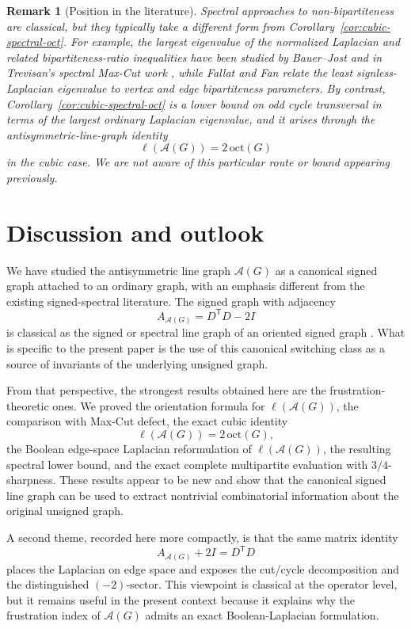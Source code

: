 \documentclass[11pt]{article}
\newtheorem{remark}{Remark}
\theoremstyle{plain}
\begin{document}
\begin{remark}[Position in the literature]
\label{rem:spectral-literature}
Spectral approaches to non-bipartiteness are classical, but they typically take a
different form from Corollary~\ref{cor:cubic-spectral-oct}.
For example, the largest eigenvalue of the normalized Laplacian and related
bipartiteness-ratio inequalities have been studied by Bauer--Jost
\cite{BauerJost2013} and in Trevisan's spectral Max-Cut work
\cite{Trevisan2012}, while Fallat and Fan \cite{FallatFan2012} relate the least
signless-Laplacian eigenvalue to vertex and edge bipartiteness parameters.
By contrast, Corollary~\ref{cor:cubic-spectral-oct} is a lower bound on odd
cycle transversal in terms of the largest \emph{ordinary} Laplacian eigenvalue,
and it arises through the antisymmetric-line-graph identity
\[
\ell(\mathcal A(G))=2\,\mathrm{oct}(G)
\]
in the cubic case.
We are not aware of this particular route or bound appearing previously.
\end{remark}

\section{Discussion and outlook}
\label{sec:outlook}

We have studied the antisymmetric line graph $\mathcal{A}(G)$ as a canonical
signed graph attached to an ordinary graph, with an emphasis different from the
existing signed-spectral literature. The signed graph with adjacency
\[
A_{\mathcal A(G)}=D^{\mathsf T}D-2I
\]
is classical as the signed or spectral line graph of an oriented signed graph
\cite{GerminaHameedZaslavsky2011,Zaslavsky2010Matrices,BelardoPisanskiStanicZaslavsky2023}.
What is specific to the present paper is the use of this canonical switching
class as a source of invariants of the underlying unsigned graph.

From that perspective, the strongest results obtained here are the
frustration-theoretic ones. We proved the orientation formula for
$\ell(\mathcal A(G))$, the comparison with Max-Cut defect, the exact cubic
identity
\[
\ell(\mathcal A(G))=2\,\mathrm{oct}(G),
\]
the Boolean edge-space Laplacian reformulation of $\ell(\mathcal A(G))$, the
resulting spectral lower bound, and the exact complete multipartite evaluation
with $3/4$-sharpness. These results appear to be new and show that the canonical
signed line graph can be used to extract nontrivial combinatorial information
about the original unsigned graph.

A second theme, recorded here more compactly, is that the same matrix identity
\[
A_{\mathcal A(G)}+2I=D^{\mathsf T}D
\]
places the Laplacian on edge space and exposes the cut/cycle decomposition and
the distinguished $(-2)$-sector. This viewpoint is classical at the operator
level, but it remains useful in the present context because it explains why the
frustration index of $\mathcal A(G)$ admits an exact Boolean-Laplacian
formulation.
\end{document}
